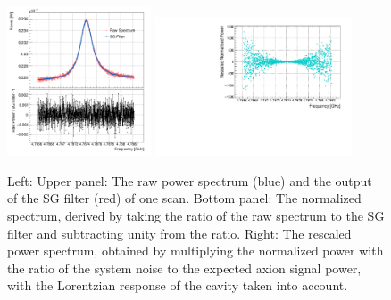 \begin{figure} [htbp]
  \centering
  \includegraphics[width=0.38\textwidth,height = 0.4\textwidth]{figures/RawPower_SGPower_Ratio_vs_Freq_Step_0100.png}
  \includegraphics[width=0.52\textwidth,height = 0.4\textwidth]{figures/RescaledPower_vs_Freq_Step_0100.pdf}
  \caption{Left: Upper panel: The raw power spectrum (blue) and the output of 
the SG filter (red) of one scan. Bottom panel: The normalized spectrum,  
derived by taking the ratio of the raw spectrum to the SG filter and 
subtracting unity from the ratio. 
  Right: The rescaled power spectrum, obtained by multiplying the normalized 
power with the ratio of the system noise to the expected axion signal power, 
with the Lorentzian response of the cavity taken into account.}
  \label{fig:raw_sg_power}
\end{figure}





